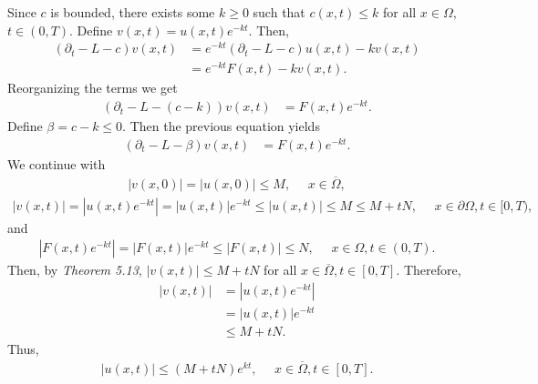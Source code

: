 \begin{questions}
{}
\begin{solution}
Since $c$ is bounded, there exists some $k\geq 0$ such that $c(x,t)\leq k$ for all $x \in \Omega$, $t \in (0, T)$. Define $v(x,t)=u(x,t)e^{-kt}$. Then,
\begin{align*}
\left(\partial_t-L-c\right)v(x,t)&=e^{-kt}\left(\partial_t-L-c\right)u(x,t)-kv(x,t)\\
&=e^{-kt}F(x,t)-kv(x,t).
\end{align*}
Reorganizing the terms we get
\begin{align*}
\left(\partial_t-L-(c-k)\right)v(x,t)&=F(x,t)e^{-kt}.
\end{align*}
Define $\beta=c-k\leq 0$. Then the previous equation yields
\begin{align*}
\left(\partial_t-L-\beta\right)v(x,t)&=F(x,t)e^{-kt}.
\end{align*}
We continue with
\begin{align*}
\left|v(x,0)\right|=\left|u(x,0)\right|\leq M,~~~~~~x\in\overline{\Omega},
\end{align*}
\begin{align*}
\left|v(x,t)\right|=\left|u(x,t)e^{-kt}\right|=\left|u(x,t)\right|e^{-kt}\leq\left|u(x,t)\right|\leq M\leq M+tN,~~~~~~x\in\partial\Omega,t\in[0,T),
\end{align*}
and
\begin{align*}
\left|F(x,t)e^{-kt}\right|=\left|F(x,t)\right|e^{-kt}\leq\left|F(x,t)\right|\leq N,~~~~~~x\in\Omega,t\in(0,T).
\end{align*}
Then, by \textsl{Theorem 5.13}, $\left|v(x,t)\right|\leq M+tN$ for all $x\in\overline{\Omega},t\in[0,T]$. Therefore,
\begin{align*}
\left|v(x,t)\right|&=\left|u(x,t)e^{-kt}\right|\\
&=\left|u(x,t)\right|e^{-kt}\\
&\leq M+tN.
\end{align*}
Thus,
\begin{align*}
\left|u(x,t)\right|\leq (M+tN)e^{kt},~~~~~~x \in \overline{\Omega}, t \in [0, T].
\end{align*}
\end{solution}
\end{questions}